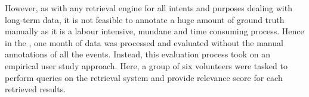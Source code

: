 However, as with any retrieval engine for all intents and purposes dealing with long-term data, it is not feasible to annotate a huge amount of ground truth manually as it is a labour intensive, mundane and time consuming process. Hence in the \versionTwoRet, one month of data was processed and evaluated without the manual annotations of all the events. 
Instead, this evaluation process took on an empirical user study approach. Here, a group of six volunteers were tasked to perform queries on the retrieval system and provide relevance score for each retrieved results. 



